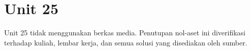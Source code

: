 \section*{Unit 25}
Unit 25 tidak menggunakan berkas media. Penutupan nol-aset ini diverifikasi terhadap kuliah, lembar kerja, dan semua solusi yang disediakan oleh sumber.
